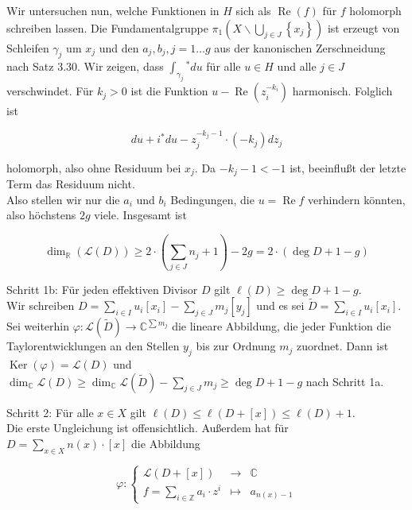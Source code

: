 \documentclass[10pt, letterpaper]{article}
\begin{document}
Wir untersuchen nun, welche Funktionen in $H$ sich als $\operatorname{Re}(f)$ für $f$ holomorph schreiben lassen. Die Fundamentalgruppe $\pi_{1}\left(X \backslash \bigcup_{j \in J}\left\{x_{j}\right\}\right)$ ist erzeugt von Schleifen $\gamma_{j}$ um $x_{j}$ und den $a_{j}, b_{j}, j=1 \ldots g$ aus der kanonischen Zerschneidung nach Satz 3.30. Wir zeigen, dass $\int_{\gamma_{j}}{ }^{*} d u$ für alle $u \in H$ und alle $j \in J$\\
verschwindet. Für $k_{j}>0$ ist die Funktion $u-\operatorname{Re}\left(z_{i}^{-k_{i}}\right)$ harmonisch. Folglich ist

$$
d u+i^{*} d u-z_{j}^{-k_{j}-1} \cdot\left(-k_{j}\right) d z_{j}
$$

holomorph, also ohne Residuum bei $x_{j}$. Da $-k_{j}-1<-1$ ist, beeinflußt der letzte Term das Residuum nicht.\\
Also stellen wir nur die $a_{i}$ und $b_{i}$ Bedingungen, die $u=\operatorname{Re} f$ verhindern könnten, also höchstens $2 g$ viele. Insgesamt ist

$$
\operatorname{dim}_{\mathbb{R}}(\mathcal{L}(D)) \geq 2 \cdot\left(\sum_{j \in J} n_{j}+1\right)-2 g=2 \cdot(\operatorname{deg} D+1-g)
$$

Schritt 1b: Für jeden effektiven Divisor $D$ gilt $\ell(D) \geqslant \operatorname{deg} D+1-g$.\\
Wir schreiben $D=\sum_{i \in I} u_{i}\left[x_{i}\right]-\sum_{j \in J} m_{j}\left[y_{j}\right]$ und es sei $\widetilde{D}=\sum_{i \in I} u_{i}\left[x_{i}\right]$. Sei weiterhin $\varphi: \mathcal{L}(\widetilde{D}) \longrightarrow \mathbb{C}^{\sum m_{j}}$ die lineare Abbildung, die jeder Funktion die Taylorentwicklungen an den Stellen $y_{j}$ bis zur Ordnung $m_{j}$ zuordnet. Dann ist $\operatorname{Ker}(\varphi)=\mathcal{L}(D)$ und $\operatorname{dim}_{\mathbb{C}} \mathcal{L}(D) \geqslant \operatorname{dim}_{\mathbb{C}} \mathcal{L}(\widetilde{D})-\sum_{j \in J} m_{j} \geqslant \operatorname{deg} D+1-g$ nach Schritt 1a.

Schritt 2: Für alle $x \in X$ gilt $\ell(D) \leq \ell(D+[x]) \leq \ell(D)+1$.\\
Die erste Ungleichung ist offensichtlich. Außerdem hat für $D=\sum_{x \in X} n(x) \cdot[x]$ die Abbildung

$$
\varphi:\left\{\begin{array}{lll}
\mathcal{L}(D+[x]) & \longrightarrow & \mathbb{C} \\
f=\sum_{i \in \mathbb{Z}} a_{i} \cdot z^{i} & \longmapsto & a_{n(x)-1}
\end{array}\right.
$$
\end{document}
